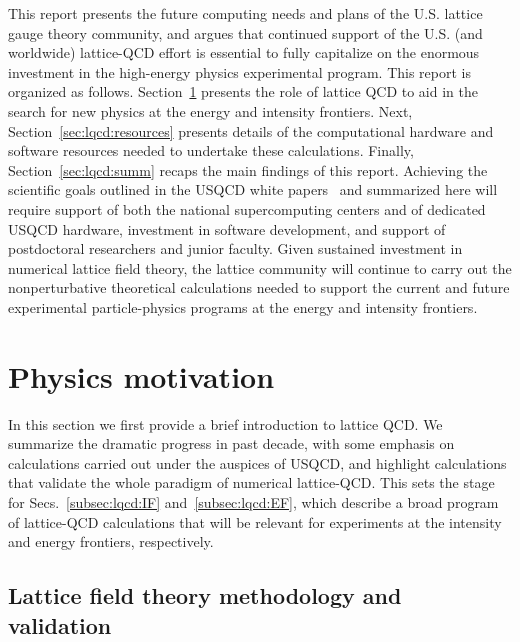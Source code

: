 This report presents the future computing needs and plans of the U.S. lattice
gauge theory community, and argues that continued support of the U.S. (and
worldwide) lattice-QCD effort is essential to fully capitalize on the enormous
investment in the high-energy physics experimental program.  This report is
organized as follows.  Section~\ref{sec:lqcd:physics} presents the role of
lattice QCD to aid in the search for new physics at the energy and intensity
frontiers.  Next, Section~\ref{sec:lqcd:resources} presents details of the
computational hardware and software resources needed to undertake these
calculations.  Finally, Section~\ref{sec:lqcd:summ} recaps the main findings
of this report.  Achieving the scientific goals outlined in the USQCD white
papers~\cite{USQCD_EF_whitepaper13,USQCD_IF_whitepaper13} and summarized here
will require support of both the national supercomputing centers and of
dedicated USQCD hardware, investment in software development, and support of
postdoctoral researchers and junior faculty.  Given sustained investment in
numerical lattice field theory, the lattice community will continue to carry
out the nonperturbative theoretical calculations needed to support the current
and future experimental particle-physics programs at the energy and intensity
frontiers.

\section{Physics motivation}
\label{sec:lqcd:physics}

In this section we first provide a brief introduction to lattice QCD.  We
summarize the dramatic progress in past decade, with some emphasis on
calculations carried out under the auspices of USQCD, and highlight
calculations that validate the whole paradigm of numerical lattice-QCD.  This
sets the stage for Secs.~\ref{subsec:lqcd:IF} and~\ref{subsec:lqcd:EF}, which
describe a broad program of lattice-QCD calculations that will be relevant for
experiments at the intensity and energy frontiers, respectively.

\subsection{Lattice field theory methodology and validation}
\label{subsec:lqcd:validation}

